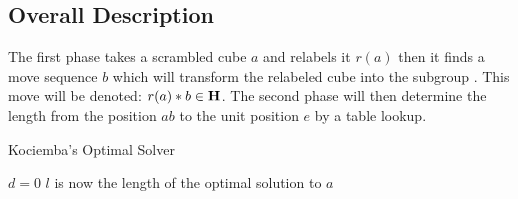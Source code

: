 \begin{figure}[!hbt]
	\centering
	\hspace{0.05\textwidth}
	\caption{}
	\label{fig:relabel2}
\end{figure}

\subsection{Overall Description}
\label{sub:overallDescription}
The first phase takes a scrambled cube $a$ and relabels it $r(a)$ then it finds a move sequence $b$ which will transform the relabeled cube into the subgroup . This move will be denoted: $r(a)*b \in \textbf{H}$. The second phase will then determine the length from the position $ab$ to the unit position $e$ by a table lookup. 


\begin{algorithm}[!htb]                     
\caption{Kociemba's Optimal Solver \cite{rokicki09}}          
\label{alg:kociemba}        
\begin{algorithmic}[1]
\STATE $d=0$
			\ENDIF
		\ENDIF
	\ENDFOR
\ENDWHILE
\STATE $l$ is now the length of the optimal solution to $a$
\end{algorithmic}
\end{algorithm}

